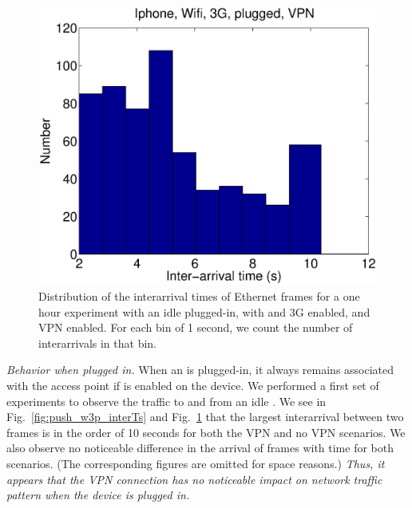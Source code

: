 \begin{figure}
\centering
        \includegraphics[width=0.8\linewidth]{../../code/pushNotification/Fig/bw_iphone_wifi_3g_plug_vpn_interTs.eps}
  \caption{Distribution of the interarrival times of Ethernet frames
    for a one hour experiment with an idle \iphone{} plugged-in, with \wifi{} and 3G
    enabled, and VPN enabled. For each bin of 1 second, we count
    the number of interarrivals in that bin.}
  \label{fig:push_w3pv_interTs}
\end{figure}


\emph{Behavior when plugged in.} When an \iphone{} is plugged-in, it always remains associated with the
\wifi{} access point if \wifi{} is enabled on the device. We performed
a first set of experiments to observe the traffic to and from an idle
\iphone{}. We see in Fig.~\ref{fig:push_w3p_interTs} and
Fig.~\ref{fig:push_w3pv_interTs} that the largest interarrival between
two frames is in the order of 10 seconds for both the VPN and no VPN
scenarios. We also observe no noticeable difference in the arrival of
frames with time for both scenarios. (The corresponding figures are 
omitted for space reasons.)
\emph{Thus, it appears that the VPN connection has no noticeable
  impact on network traffic pattern when the device is plugged in.}

